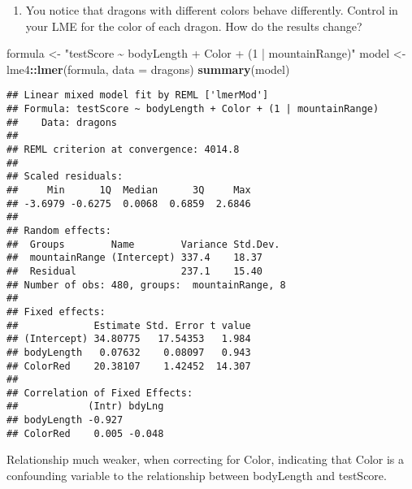 \documentclass[
]{article}
\newenvironment{Shaded}{\begin{snugshade}}{\end{snugshade}}
\newcommand{\AttributeTok}[1]{\textcolor[rgb]{0.13,0.29,0.53}{#1}}
\newcommand{\FunctionTok}[1]{\textcolor[rgb]{0.13,0.29,0.53}{\textbf{#1}}}
\newcommand{\NormalTok}[1]{#1}
\newcommand{\OtherTok}[1]{\textcolor[rgb]{0.56,0.35,0.01}{#1}}
\newcommand{\SpecialCharTok}[1]{\textcolor[rgb]{0.81,0.36,0.00}{\textbf{#1}}}
\newcommand{\StringTok}[1]{\textcolor[rgb]{0.31,0.60,0.02}{#1}}
\providecommand{\tightlist}{%
  \setlength{\itemsep}{0pt}\setlength{\parskip}{0pt}}
\begin{document}
\begin{enumerate}
\def\labelenumi{\alph{enumi})}
\setcounter{enumi}{2}
\tightlist
\item
  You notice that dragons with different colors behave differently.
  Control in your LME for the color of each dragon. How do the results
  change?
\end{enumerate}

\begin{Shaded}
\begin{Highlighting}[]
\NormalTok{formula }\OtherTok{\textless{}{-}} \StringTok{"testScore \textasciitilde{} bodyLength + Color + (1 | mountainRange)"}
\NormalTok{model }\OtherTok{\textless{}{-}}\NormalTok{ lme4}\SpecialCharTok{::}\FunctionTok{lmer}\NormalTok{(formula, }\AttributeTok{data =}\NormalTok{ dragons) }
\FunctionTok{summary}\NormalTok{(model)}
\end{Highlighting}
\end{Shaded}

\begin{verbatim}
## Linear mixed model fit by REML ['lmerMod']
## Formula: testScore ~ bodyLength + Color + (1 | mountainRange)
##    Data: dragons
## 
## REML criterion at convergence: 4014.8
## 
## Scaled residuals: 
##     Min      1Q  Median      3Q     Max 
## -3.6979 -0.6275  0.0068  0.6859  2.6846 
## 
## Random effects:
##  Groups        Name        Variance Std.Dev.
##  mountainRange (Intercept) 337.4    18.37   
##  Residual                  237.1    15.40   
## Number of obs: 480, groups:  mountainRange, 8
## 
## Fixed effects:
##             Estimate Std. Error t value
## (Intercept) 34.80775   17.54353   1.984
## bodyLength   0.07632    0.08097   0.943
## ColorRed    20.38107    1.42452  14.307
## 
## Correlation of Fixed Effects:
##            (Intr) bdyLng
## bodyLength -0.927       
## ColorRed    0.005 -0.048
\end{verbatim}

Relationship much weaker, when correcting for Color, indicating that
Color is a confounding variable to the relationship between bodyLength
and testScore.
\end{document}
